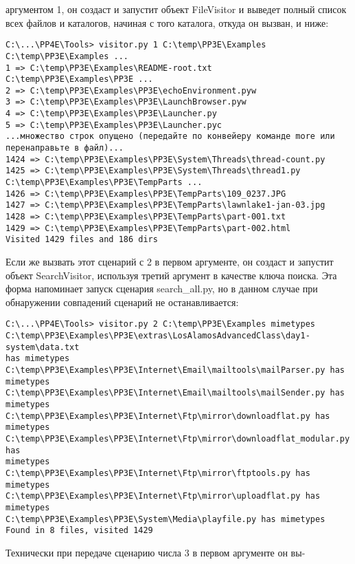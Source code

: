\documentclass[12pt]{article}
\begin{document}
аргументом 1, он создаст и запустит объект FileVisitor и выведет полный список всех файлов и каталогов, начиная с того каталога, откуда
он вызван, и ниже:
\begin{verbatim}
C:\...\PP4E\Tools> visitor.py 1 C:\temp\PP3E\Examples
C:\temp\PP3E\Examples ...
1 => C:\temp\PP3E\Examples\README-root.txt
C:\temp\PP3E\Examples\PP3E ...
2 => C:\temp\PP3E\Examples\PP3E\echoEnvironment.pyw
3 => C:\temp\PP3E\Examples\PP3E\LaunchBrowser.pyw
4 => C:\temp\PP3E\Examples\PP3E\Launcher.py
5 => C:\temp\PP3E\Examples\PP3E\Launcher.pyc
...множество строк опущено (передайте по конвейеру команде more или
перенаправьте в файл)...
1424 => C:\temp\PP3E\Examples\PP3E\System\Threads\thread-count.py
1425 => C:\temp\PP3E\Examples\PP3E\System\Threads\thread1.py
C:\temp\PP3E\Examples\PP3E\TempParts ...
1426 => C:\temp\PP3E\Examples\PP3E\TempParts\109_0237.JPG
1427 => C:\temp\PP3E\Examples\PP3E\TempParts\lawnlake1-jan-03.jpg
1428 => C:\temp\PP3E\Examples\PP3E\TempParts\part-001.txt
1429 => C:\temp\PP3E\Examples\PP3E\TempParts\part-002.html
Visited 1429 files and 186 dirs
\end{verbatim}
Если же вызвать этот сценарий с 2 в первом аргументе, он создаст и запустит объект SearchVisitor, используя третий аргумент в качестве
ключа поиска. Эта форма напоминает запуск сценария search\_all.py, но в данном случае при обнаружении совпадений сценарий не останавливается:
\begin{verbatim}
C:\...\PP4E\Tools> visitor.py 2 C:\temp\PP3E\Examples mimetypes
C:\temp\PP3E\Examples\PP3E\extras\LosAlamosAdvancedClass\day1-system\data.txt
has mimetypes
C:\temp\PP3E\Examples\PP3E\Internet\Email\mailtools\mailParser.py has mimetypes
C:\temp\PP3E\Examples\PP3E\Internet\Email\mailtools\mailSender.py has mimetypes
C:\temp\PP3E\Examples\PP3E\Internet\Ftp\mirror\downloadflat.py has mimetypes
C:\temp\PP3E\Examples\PP3E\Internet\Ftp\mirror\downloadflat_modular.py has
mimetypes
C:\temp\PP3E\Examples\PP3E\Internet\Ftp\mirror\ftptools.py has mimetypes
C:\temp\PP3E\Examples\PP3E\Internet\Ftp\mirror\uploadflat.py has mimetypes
C:\temp\PP3E\Examples\PP3E\System\Media\playfile.py has mimetypes
Found in 8 files, visited 1429
\end{verbatim}
Технически при передаче сценарию числа 3 в первом аргументе он вы-
\end{document}
